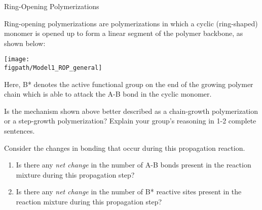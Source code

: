 \begin{activity}{Ring-Opening Polymerizations}
\begin{instructornotes}
\end{instructornotes}


\begin{model}
	\label{\labelbase:mdl:ROP}

	Ring-opening polymerizations are polymerizations in which a cyclic (ring-shaped) monomer is opened up to form a linear segment of the polymer backbone, as shown below:
	
	\centerline{\texttt{[image: \\figpath/Model1\_ROP\_general]}}
	
	Here, B* denotes the active functional group on the end of the growing polymer chain which is able to attack the A-B bond in the cyclic monomer.
	
	
	
\end{model}


\begin{ctqs}

	\question Is the mechanism shown above better described as a chain-growth polymerization or a step-growth polymerization?  Explain your group's reasoning in 1-2 complete sentences.
			
				\begin{solution}[1in]
				\end{solution}

	\question Consider the changes in bonding that occur during this propagation reaction.
	
		\begin{enumerate}
		
			\item Is there any \emph{net change} in the number of A-B bonds present in the reaction mixture during this propagation step?
			
				\begin{solution}[0.5in]
				\end{solution}
	
			\item Is there any \emph{net change} in the number of B* reactive sites present in the reaction mixture during this propagation step?
			
				\begin{solution}[0.5in]
				\end{solution}
	

\end{enumerate}
\end{ctqs}
\end{activity}
